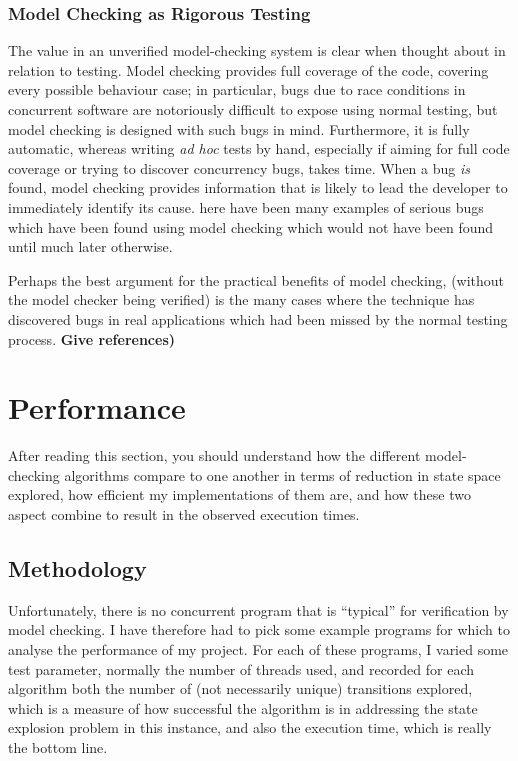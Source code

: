 \documentclass[12pt,a4paper,twoside,openright]{report}
\begin{document}
\subsubsection{Model Checking as Rigorous Testing}
The value in an unverified model-checking system
is clear when thought about in relation to testing.
Model checking provides full coverage of the code,
covering every possible behaviour case; in particular,
bugs due to race conditions in concurrent software
are notoriously difficult to expose using normal
testing, but model checking is designed with such
bugs in mind. Furthermore,
it is fully automatic, whereas writing \textit{ad hoc}
tests by hand, especially if aiming
for full code coverage or trying to discover
concurrency bugs, takes time.
When a bug \emph{is} found, model checking
provides information that is likely to lead the
developer to immediately identify its cause.
here have been many examples of serious bugs
which have been found using model checking
which would not have been found until much
later otherwise.

Perhaps the best argument for the practical
benefits of model checking, (without the
model checker being verified)
is the many cases where the technique has
discovered bugs in real applications which
had been missed by the normal testing
process. \textbf{Give references)}

\section{Performance}
After reading this section, you should
understand how the different
model-checking algorithms compare to
one another in terms of reduction in
state space explored,
how efficient my implementations of
them are, and how these two aspect
combine to result in the observed execution
times.

\subsection{Methodology}
Unfortunately, there is no concurrent program
that is ``typical'' for verification by model
checking. I have therefore had to pick some
example programs for which to analyse the performance
of my project. For each of these programs, I varied
some test parameter, normally the number of threads
used, and recorded for each algorithm
both the number of (not necessarily unique) transitions
explored, which is a measure of how successful
the algorithm is in addressing the state
explosion problem in this instance, and also
the execution time, which is really the bottom
line.
\end{document}
